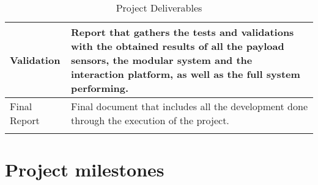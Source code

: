 \begin{longtable}[H]{>{\raggedright\arraybackslash}p{4cm} p{10cm}}
	Validation & 
	Report that gathers the tests and validations with the obtained results of all the payload sensors, the modular system and the interaction platform, as well as the full system performing. 
	\vspace{0.2cm}
	\\ \midrule
		
	Final Report & 
	Final document that includes all the development done through the execution of the project. 
	\vspace{0.2cm}

	\\ \bottomrule[2pt]
	
	\caption{Project Deliverables}
	\label{PDel}

\end{longtable}

\section{Project milestones}
